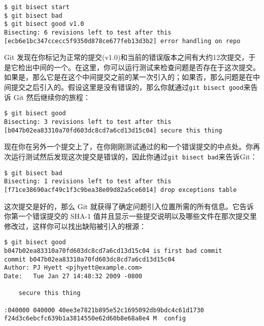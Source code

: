 \documentclass[a4paper]{book}
\newcounter{tab}[chapter]
\begin{document}
\begin{shaded}\begin{verbatim}
$ git bisect start
$ git bisect bad
$ git bisect good v1.0
Bisecting: 6 revisions left to test after this
[ecb6e1bc347ccecc5f9350d878ce677feb13d3b2] error handling on repo
\end{verbatim}\end{shaded}

Git 发现在你标记为正常的提交(v1.0)和当前的错误版本之间有大约12次提交，于是它检出中间的一个。在这里，你可以运行测试来检查问题是否存在于这次提交。如果是，那么它是在这个中间提交之前的某一次引入的；如果否，那么问题是在中间提交之后引入的。假设这里是没有错误的，那么你就通过\texttt{git bisect good}来告诉 Git 然后继续你的旅程：

\begin{shaded}\begin{verbatim}
$ git bisect good
Bisecting: 3 revisions left to test after this
[b047b02ea83310a70fd603dc8cd7a6cd13d15c04] secure this thing
\end{verbatim}\end{shaded}

现在你在另外一个提交上了，在你刚刚测试通过的和一个错误提交的中点处。你再次运行测试然后发现这次提交是错误的，因此你通过\texttt{git bisect bad}来告诉Git：

\begin{shaded}\begin{verbatim}
$ git bisect bad
Bisecting: 1 revisions left to test after this
[f71ce38690acf49c1f3c9bea38e09d82a5ce6014] drop exceptions table
\end{verbatim}\end{shaded}

这次提交是好的，那么 Git 就获得了确定问题引入位置所需的所有信息。它告诉你第一个错误提交的 SHA-1 值并且显示一些提交说明以及哪些文件在那次提交里修改过，这样你可以找出缺陷被引入的根源：

\begin{shaded}\begin{verbatim}
$ git bisect good
b047b02ea83310a70fd603dc8cd7a6cd13d15c04 is first bad commit
commit b047b02ea83310a70fd603dc8cd7a6cd13d15c04
Author: PJ Hyett <pjhyett@example.com>
Date:   Tue Jan 27 14:48:32 2009 -0800

    secure this thing

:040000 040000 40ee3e7821b895e52c1695092db9bdc4c61d1730
f24d3c6ebcfc639b1a3814550e62d60b8e68a8e4 M  config
\end{verbatim}\end{shaded}
\end{document}
